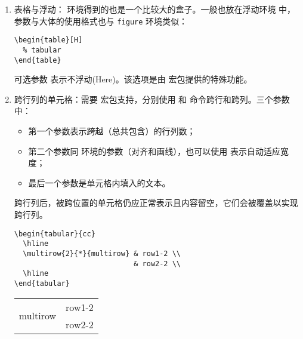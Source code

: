 \begin{enumerate}
\item 表格与浮动： 环境得到的也是一个比较大的盒子。一般也放在浮动环境  中，参数与大体的使用格式也与 \verb|figure| 环境类似：

\begin{tcolorbox}
\begin{lstlisting}
\begin{table}[H]
  % tabular
\end{table}
\end{lstlisting}
\end{tcolorbox}

可选参数 \boxforcmd{[H]} 表示不浮动(Here)。该选项是由  宏包提供的特殊功能。

\item 跨行列的单元格：需要  宏包支持，分别使用 \boxforcmd{\\multirow{}{}{}} 和 \boxforcmd{\\multicolumn{}{}{}} 命令跨行和跨列。三个参数中：

\begin{itemize}
    \item 第一个参数表示跨越（总共包含）的行列数；
    \item 第二个参数同  环境的参数（对齐和画线），也可以使用 \boxforcmd{*} 表示自动适应宽度；
    \item 最后一个参数是单元格内填入的文本。
\end{itemize}

跨行列后，被跨位置的单元格仍应正常表示且内容留空，它们会被覆盖以实现跨行列。

\begin{tcolorbox}[sidebyside]
\begin{lstlisting}
\begin{tabular}{cc}
  \hline
  \multirow{2}{*}{multirow} & row1-2 \\
                            & row2-2 \\
  \hline
\end{tabular}
\end{lstlisting} 

\tcblower

\begin{tabular}{cc}
    \hline
    \multirow{2}{*}{multirow} & row1-2\\
        & row2-2 \\
    \hline
\end{tabular}
\end{tcolorbox}


\end{enumerate}
